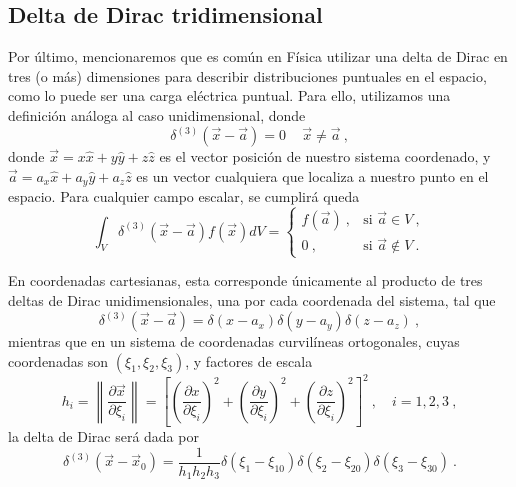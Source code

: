 \subsection{Delta de Dirac tridimensional}

Por último, mencionaremos que es común en Física utilizar una delta de Dirac en tres (o más) dimensiones para describir distribuciones puntuales en el espacio, como lo puede ser una carga eléctrica puntual. Para ello, utilizamos una definición análoga al caso unidimensional, donde
\begin{equation}
    \delta^{(3)}(\vec{x}-\vec{a}) = 0 \, \quad \vec{x} \neq \vec{a} \ ,
\end{equation}
donde $\vec{x} = x \hat{x} + y \hat{y} + z\hat{z}$ es el vector posición de nuestro sistema coordenado, y $\vec{a} = a_x \hat{x} + a_y \hat{y} + a_z \hat{z}$ es un vector cualquiera que localiza a nuestro punto en el espacio. Para cualquier campo escalar, se cumplirá queda
\begin{equation}
    \int_V \delta^{(3)} (\vec{x}-\vec{a}) f(\vec{x}) dV = \left\{\begin{array}{cc}
        f(\vec{a}) \ , & \text{si } \vec{a} \in V \ , \\
        0 \ , & \text{si } \vec{a} \notin V \ .
    \end{array}\right.
\end{equation}

En coordenadas cartesianas, esta corresponde únicamente al producto de tres deltas de Dirac unidimensionales, una por cada coordenada del sistema, tal que
\begin{equation}
    \delta^{(3)}(\vec{x} - \vec{a}) = \delta(x-a_x) \delta(y - a_y) \delta(z - a_z) \ ,
\end{equation}
mientras que en un sistema de coordenadas curvilíneas ortogonales, cuyas coordenadas son $(\xi_1, \xi_2, \xi_3)$, y factores de escala 
\begin{equation}
    h_i = \left\| \frac{\partial \vec{x}}{\partial \xi_i} \right\| = \left[ \left( \frac{\partial x}{\partial \xi_i} \right)^2 + \left( \frac{\partial y}{\partial \xi_i} \right)^2 + \left( \frac{\partial z}{\partial \xi_i} \right)^2 \right]^2 \ , \quad i = 1, 2, 3 \ ,
\end{equation}
la delta de Dirac será dada por
\begin{equation}
    \delta^{(3)}(\vec{x}-\vec{x}_0) = \frac{1}{h_1 h_2 h_3} \delta(\xi_1 - \xi_{10}) \delta(\xi_2 - \xi_{20}) \delta(\xi_3 - \xi_{30}) \ .
\end{equation}

